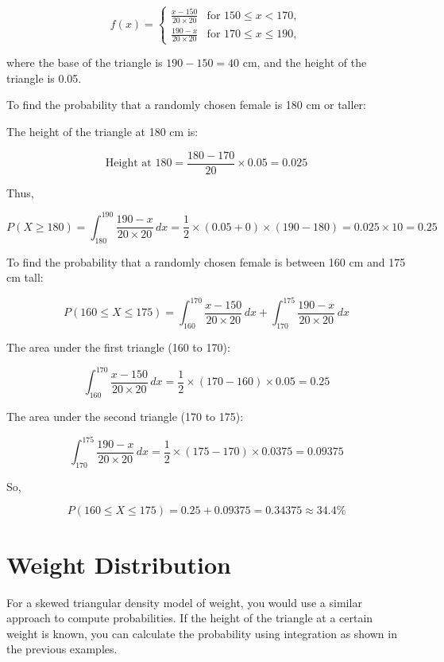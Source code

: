 \documentclass{article}
\begin{document}
\[
f(x) = \begin{cases}
\frac{x - 150}{20 \times 20} & \text{for } 150 \leq x < 170, \\
\frac{190 - x}{20 \times 20} & \text{for } 170 \leq x \leq 190,
\end{cases}
\]

where the base of the triangle is \( 190 - 150 = 40 \) cm, and the height of the triangle is 0.05. 

To find the probability that a randomly chosen female is 180 cm or taller:

The height of the triangle at 180 cm is:

\[
\text{Height at } 180 = \frac{180 - 170}{20} \times 0.05 = 0.025
\]

Thus,

\[
P(X \geq 180) = \int_{180}^{190} \frac{190 - x}{20 \times 20} \, dx = \frac{1}{2} \times (0.05 + 0) \times (190 - 180) = 0.025 \times 10 = 0.25
\]

To find the probability that a randomly chosen female is between 160 cm and 175 cm tall:

\[
P(160 \leq X \leq 175) = \int_{160}^{170} \frac{x - 150}{20 \times 20} \, dx + \int_{170}^{175} \frac{190 - x}{20 \times 20} \, dx
\]

The area under the first triangle (160 to 170):

\[
\int_{160}^{170} \frac{x - 150}{20 \times 20} \, dx = \frac{1}{2} \times (170 - 160) \times 0.05 = 0.25
\]

The area under the second triangle (170 to 175):

\[
\int_{170}^{175} \frac{190 - x}{20 \times 20} \, dx = \frac{1}{2} \times (175 - 170) \times 0.0375 = 0.09375
\]

So,

\[
P(160 \leq X \leq 175) = 0.25 + 0.09375 = 0.34375 \approx 34.4\%
\]

\section{Weight Distribution}
For a skewed triangular density model of weight, you would use a similar approach to compute probabilities. If the height of the triangle at a certain weight is known, you can calculate the probability using integration as shown in the previous examples.
\end{document}
